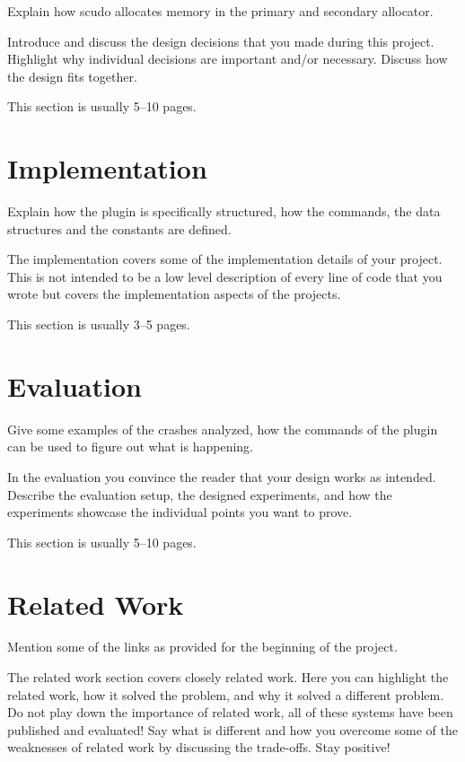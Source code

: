 \documentclass[a4paper,11pt,oneside]{report}
\begin{document}
Explain how scudo allocates memory in the primary and secondary allocator.

Introduce and discuss the design decisions that you made during this project.
Highlight why individual decisions are important and/or necessary. Discuss
how the design fits together.

This section is usually 5–10 pages.


\chapter{Implementation}

Explain how the plugin is specifically structured, how the commands, the data
structures and the constants are defined.



The implementation covers some of the implementation details of your project.
This is not intended to be a low level description of every line of code that
you wrote but covers the implementation aspects of the projects.

This section is usually 3–5 pages.


\chapter{Evaluation}

Give some examples of the crashes analyzed, how the commands of the plugin
can be used to figure out what is happening.

In the evaluation you convince the reader that your design works as intended.
Describe the evaluation setup, the designed experiments, and how the
experiments showcase the individual points you want to prove.

This section is usually 5–10 pages.


\chapter{Related Work}

Mention some of the links as provided for the beginning of the project.

The related work section covers closely related work. Here you can highlight
the related work, how it solved the problem, and why it solved a different
problem. Do not play down the importance of related work, all of these
systems have been published and evaluated! Say what is different and how
you overcome some of the weaknesses of related work by discussing the 
trade-offs. Stay positive!
\end{document}
